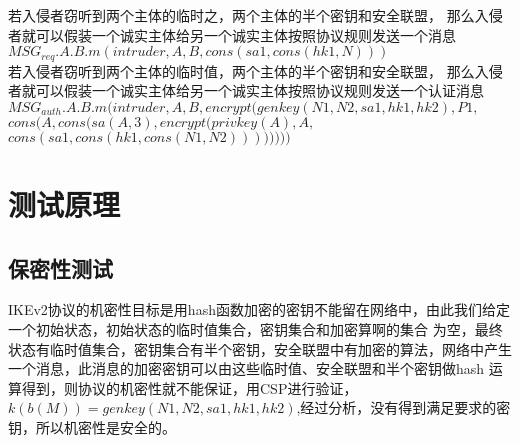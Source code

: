 \documentclass[UTF8]{ctexart}
\begin{document}
\par{
	若入侵者窃听到两个主体的临时之，两个主体的半个密钥和安全联盟，
	那么入侵者就可以假装一个诚实主体给另一个诚实主体按照协议规则发送一个消息 \\
	$MSG_{req}.A.B.m(intruder,A,B,cons(sa1,cons(hk1,N)))$\\
	若入侵者窃听到两个主体的临时值，两个主体的半个密钥和安全联盟，
	那么入侵者就可以假装一个诚实主体给另一个诚实主体按照协议规则发送一个认证消息 \\
			$MSG_{auth}.A.B.m(intruder,A,B,encrypt(genkey(N1,N2,sa1,hk1,hk2),P1, $\\
			$cons(A,cons(sa(A,3),encrypt(privkey(A),A,$\\
			$cons(sa1,cons(hk1,cons(N1,N2))))))))$

}
\section{测试原理}
\subsection{保密性测试}
IKEv2协议的机密性目标是用hash函数加密的密钥不能留在网络中，由此我们给定一个初始状态，初始状态的临时值集合，密钥集合和加密算啊的集合
为空，最终状态有临时值集合，密钥集合有半个密钥，安全联盟中有加密的算法，网络中产生一个消息，此消息的加密密钥可以由这些临时值、安全联盟和半个密钥做hash
运算得到，则协议的机密性就不能保证，用CSP进行验证，$k(b(M))=genkey(N1,N2,sa1,hk1,hk2)$,经过分析，没有得到满足要求的密钥，所以机密性是安全的。
\end{document}
